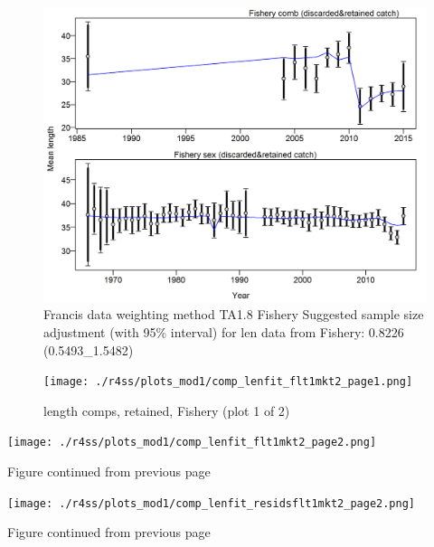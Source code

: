 \documentclass[12pt,]{article}
\begin{document}
\begin{figure}
\centering
\includegraphics{./r4ss/plots_mod1/comp_lenfit_data_weighting_TA1.8_Fishery.png}
\caption{Francis data weighting method TA1.8 Fishery Suggested sample
size adjustment (with 95\% interval) for len data from Fishery: 0.8226
(0.5493\_1.5482)
\label{fig:mod1_4_comp_lenfit_data_weighting_TA1.8_Fishery}}
\end{figure}

\begin{figure}
\centering
\texttt{[image: ./r4ss/plots\_mod1/comp\_lenfit\_flt1mkt2\_page1.png]}
\caption{length comps, retained, Fishery (plot 1 of 2)
\label{fig:mod1_5_comp_lenfit_flt1mkt2_page1}}
\end{figure}

\texttt{[image: ./r4ss/plots\_mod1/comp\_lenfit\_flt1mkt2\_page2.png]}

\begin{center} 

              Figure continued from previous page 

             \end{center}

\texttt{[image: ./r4ss/plots\_mod1/comp\_lenfit\_residsflt1mkt2\_page2.png]}

\begin{center} 

              Figure continued from previous page 

             \end{center}
\end{document}
